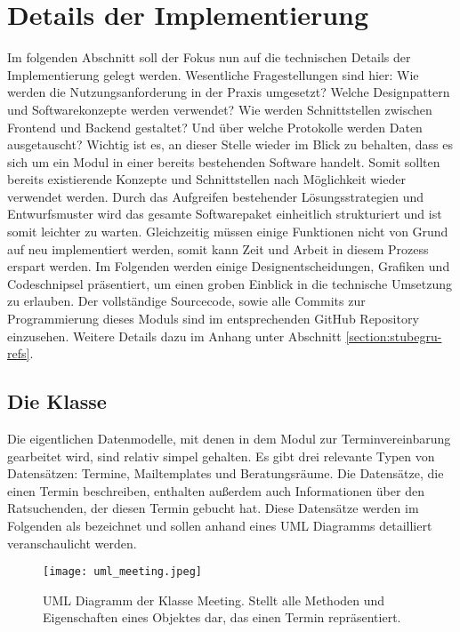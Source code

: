 \section{Details der Implementierung}
Im folgenden Abschnitt soll der Fokus nun auf die technischen Details der
Implementierung gelegt werden. Wesentliche Fragestellungen sind hier: Wie
werden die Nutzungsanforderung in der Praxis umgesetzt? Welche Designpattern
und Softwarekonzepte werden verwendet? Wie werden Schnittstellen zwischen
Frontend und Backend gestaltet? Und über welche Protokolle werden Daten
ausgetauscht? Wichtig ist es, an dieser Stelle wieder im Blick zu behalten,
dass es sich um ein Modul in einer bereits bestehenden Software handelt. Somit
sollten bereits existierende Konzepte und Schnittstellen nach Möglichkeit
wieder verwendet werden. Durch das Aufgreifen bestehender Lösungsstrategien und
Entwurfsmuster wird das gesamte Softwarepaket einheitlich strukturiert und ist
somit leichter zu warten. Gleichzeitig müssen einige Funktionen nicht von Grund
auf neu implementiert werden, somit kann Zeit und Arbeit in diesem Prozess
erspart werden\cite{wiederverwSoftware}. Im Folgenden werden einige
Designentscheidungen, Grafiken und Codeschnipsel präsentiert, um einen groben
Einblick in die technische Umsetzung zu erlauben. Der vollständige Sourcecode,
sowie alle Commits zur Programmierung dieses Moduls sind im entsprechenden
GitHub Repository einzusehen. Weitere Details dazu im Anhang unter Abschnitt
\ref{section:stubegru-refs}.

\subsection*{Die Klasse }
Die eigentlichen Datenmodelle, mit denen in dem Modul zur Terminvereinbarung
gearbeitet wird, sind relativ simpel gehalten. Es gibt drei relevante Typen von
Datensätzen: Termine, Mailtemplates und Beratungsräume. Die Datensätze, die
einen Termin beschreiben, enthalten außerdem auch Informationen über den
Ratsuchenden, der diesen Termin gebucht hat. Diese Datensätze werden im
Folgenden als  bezeichnet und sollen anhand eines \gls{UML}
Diagramms detailliert veranschaulicht werden.

\begin{figure}[H]
    \caption{UML Diagramm der Klasse Meeting. Stellt alle Methoden und Eigenschaften eines Objektes dar, das einen Termin repräsentiert.}
    \centering
    \texttt{[image: uml\_meeting.jpeg]}
\end{figure}

